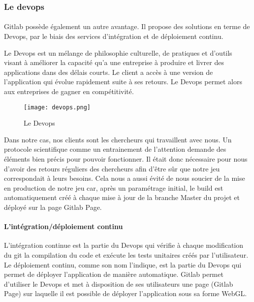 \subsubsection{Le devops}

\paragraph{}Gitlab possède également un autre avantage. Il propose des solutions en terme de Devops, par le biais des services d'intégration et de déploiement continu.

Le Devops est un mélange de philosophie culturelle, de pratiques et d'outils visant à améliorer la capacité qu'a une entreprise à produire et livrer des applications
dans des délais courts. Le client a accès à une version de l'application qui évolue rapidement suite à ses retours. Le Devops permet alors aux entreprises de gagner en
compétitivité.

\begin{figure}[H]
    \begin{center}
    \texttt{[image: devops.png]}
    \end{center}
    \caption{Le Devops}
\label{Devops}
\end{figure}

Dans notre cas, nos clients sont les chercheurs qui travaillent avec nous. Un protocole scientifique comme un entrainement de l'attention demande des éléments bien précis pour
pouvoir fonctionner. Il était donc nécessaire pour nous d'avoir des retours réguliers des chercheurs afin d'être sûr que notre jeu correspondait à leurs besoins. Cela nous a aussi
évité de nous soucier de la mise en production de notre jeu car, après un paramétrage initial, le build est automatiquement créé à chaque mise à jour de la branche Master du projet et
déployé sur la page Gitlab Page.

\paragraph{L'intégration/déploiement continu}L'intégration continue est la partie du Devops qui vérifie à chaque modification du git la compilation du code et exécute les tests
unitaires créés par l'utilisateur. Le déploiement continu, comme son nom l'indique, est la partie du Devops qui permet de déployer l'application de manière automatique. Gitlab permet
d'utiliser le Devops et met à disposition de ses utilisateurs une page (Gitlab Page) sur laquelle il est possible de déployer l'application sous sa forme WebGL.

